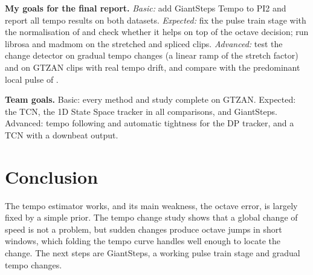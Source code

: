 \documentclass{article}
\begin{document}
\textbf{My goals for the final report.}
\emph{Basic:} add GiantSteps Tempo to PI2 and report all tempo results on both datasets.
\emph{Expected:} fix the pulse train stage with the normalisation of \cite{percival} and check whether it helps on top of the octave decision; run librosa and madmom on the stretched and spliced clips.
\emph{Advanced:} test the change detector on gradual tempo changes (a linear ramp of the stretch factor) and on GTZAN clips with real tempo drift, and compare with the predominant local pulse of \cite{plp}.

\textbf{Team goals.} Basic: every method and study complete on GTZAN. Expected: the TCN, the 1D State Space tracker in all comparisons, and GiantSteps. Advanced: tempo following and automatic tightness for the DP tracker, and a TCN with a downbeat output.

\section{Conclusion}

The tempo estimator works, and its main weakness, the octave error, is largely fixed by a simple prior. The tempo change study shows that a global change of speed is not a problem, but sudden changes produce octave jumps in short windows, which folding the tempo curve handles well enough to locate the change. The next steps are GiantSteps, a working pulse train stage and gradual tempo changes.


\end{document}
